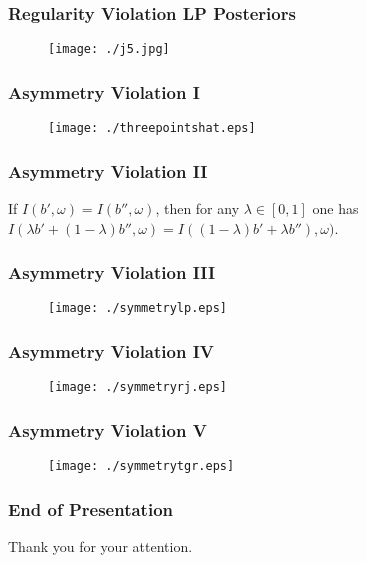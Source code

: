 \documentclass[xcolor=dvipsnames]{beamer}
\begin{document}
\begin{frame}
  \frametitle{Regularity Violation LP Posteriors}
  \begin{figure}[h]
    \texttt{[image: ./j5.jpg]}
  \end{figure}
\end{frame}

\begin{frame}
  \frametitle{Asymmetry Violation I}
  \begin{figure}[h]
    \texttt{[image: ./threepointshat.eps]}
  \end{figure}
\end{frame}

\begin{frame}
  \frametitle{Asymmetry Violation II}
  If $I(b',\omega)=I(b'',\omega)$, then for any $\lambda\in{}[0,1]$
  one has\newline
  $I(\lambda{}b'+(1-\lambda)b'',\omega)=I((1-\lambda){}b'+\lambda{}b''),\omega)$.
\end{frame}

\begin{frame}
  \frametitle{Asymmetry Violation III}
  \begin{figure}[h]
    \texttt{[image: ./symmetrylp.eps]}
  \end{figure}
\end{frame}

\begin{frame}
  \frametitle{Asymmetry Violation IV}
  \begin{figure}[h]
    \texttt{[image: ./symmetryrj.eps]}
  \end{figure}
\end{frame}

\begin{frame}
  \frametitle{Asymmetry Violation V}
  \begin{figure}[h]
    \texttt{[image: ./symmetrytgr.eps]}
  \end{figure}
\end{frame}

\begin{frame}
  \frametitle{End of Presentation}
Thank you for your attention.
\end{frame}
\end{document}

